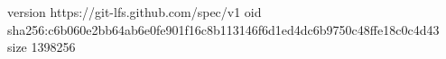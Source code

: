 version https://git-lfs.github.com/spec/v1
oid sha256:c6b060e2bb64ab6e0fe901f16c8b113146f6d1ed4dc6b9750c48ffe18c0c4d43
size 1398256
